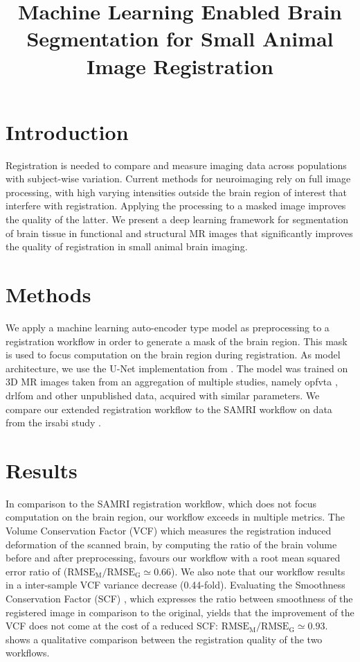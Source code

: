 \documentclass[11pt, english]{article}
\title{Machine Learning Enabled Brain Segmentation for Small Animal Image Registration}
\date{}
\begin{document}
    \maketitle


    \section{Introduction}
    Registration is needed to compare and measure imaging data across populations with subject-wise variation.
    Current methods for neuroimaging rely on full image processing, with high varying intensities outside the brain region of interest that interfere with registration.
    Applying the processing to a masked image improves the quality of the latter.
    We present a deep learning framework for segmentation of brain tissue in functional and structural MR images that significantly improves the quality of registration in small animal brain imaging.


    \section{Methods}
    We apply a machine learning auto-encoder type model as preprocessing to a registration workflow in order to generate a mask of the brain region.
    This mask is used to focus computation on the brain region during registration.
    As model architecture, we use the U-Net \citep{ronneberger_u-net:_2015} implementation from \citet{oktay_ozan-oktayattention-gated-networks_2020}.
    The model was trained on 3D MR images taken from an aggregation of multiple studies, namely opfvta \citep{ioanas_whole-brain_nodate}, drlfom \citep{imperfect_datasets} and other unpublished data, acquired with similar parameters.
    We compare our extended registration workflow to the SAMRI workflow \citep{samri} on data from the irsabi study
    \citep{irsabi_bidsdata}.


    \section{Results}
    In comparison to the SAMRI registration workflow, which does not focus computation on the brain region, our workflow exceeds in multiple metrics.
    The Volume Conservation Factor (VCF) \citep{ioanas_optimized_2019} which measures the registration induced deformation of the scanned brain, by computing the ratio of the brain volume before and after preprocessing, favours our workflow with a root mean squared error ratio of ($\mathrm{RMSE_{M}/RMSE_{G}\simeq} 0.66$).
    We also note that our workflow results in a inter-sample VCF variance decrease (0.44-fold).
    Evaluating the Smoothness Conservation Factor (SCF) \citep{ioanas_optimized_2019}, which expresses the ratio between smoothness of the registered image in comparison to the original, yields that the improvement of the VCF does not come at the cost of a reduced SCF: $\mathrm{RMSE_{M}/RMSE_{G}\simeq} 0.93$.
     shows a qualitative comparison between the registration quality of the two workflows.
\end{document}
